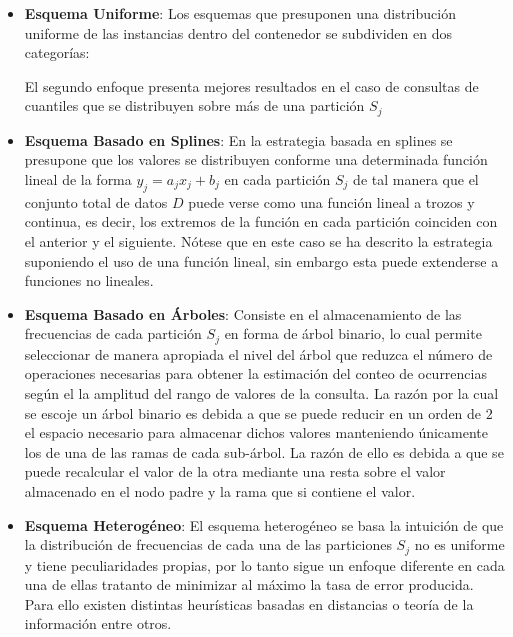 \documentclass{subfiles}
\begin{document}
        \begin{itemize}

          \item \textbf{Esquema Uniforme}: Los esquemas que presuponen una distribución uniforme de las instancias dentro del contenedor se subdividen en dos categorías:  El segundo enfoque presenta mejores resultados en el caso de consultas de cuantiles que se distribuyen sobre más de una partición $S_j$

          \item \textbf{Esquema Basado en Splines}: En la estrategia basada en splines se presupone que los valores se distribuyen conforme una determinada función lineal de la forma $y_j = a_jx_j + b_j$ en cada partición $S_j$ de tal manera que el conjunto total de datos $D$ puede verse como una función lineal a trozos y continua, es decir, los extremos de la función en cada partición coinciden con el anterior y el siguiente. Nótese que en este caso se ha descrito la estrategia suponiendo el uso de una función lineal, sin embargo esta puede extenderse a funciones no lineales.

          \item \textbf{Esquema Basado en Árboles}: Consiste en el almacenamiento de las frecuencias de cada partición $S_j$ en forma de árbol binario, lo cual permite seleccionar de manera apropiada el nivel del árbol que reduzca el número de operaciones necesarias para obtener la estimación del conteo de ocurrencias según el la amplitud del rango de valores de la consulta. La razón por la cual se escoje un árbol binario es debida a que se puede reducir en un orden de $2$ el espacio necesario para almacenar dichos valores manteniendo únicamente los de una de las ramas de cada sub-árbol. La razón de ello es debida a que se puede recalcular el valor de la otra mediante una resta sobre el valor almacenado en el nodo padre y la rama que si contiene el valor.

          \item \textbf{Esquema Heterogéneo}: El esquema heterogéneo se basa la intuición de que la distribución de frecuencias de cada una de las particiones $S_j$ no es uniforme y tiene peculiaridades propias, por lo tanto sigue un enfoque diferente en cada una de ellas tratanto de minimizar al máximo la tasa de error producida. Para ello existen distintas heurísticas basadas en distancias o teoría de la información entre otros.

        \end{itemize}
\end{document}
